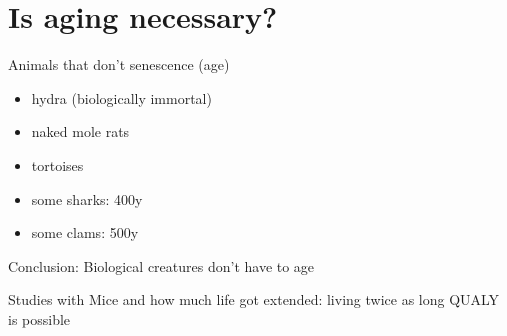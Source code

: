 \section{Is aging necessary?}


\begin{frame}[c]{Animals that don't senescence (age)}
    \large
    \begin{itemize}[<+(1)->]
        \item hydra (biologically immortal) \cite{martinez1998mortality}
        \item naked mole rats \cite{ruby2018naked}
        \item tortoises \cite{miller2001escaping}
        \item some sharks: 400y \cite{Greenlan67:online}
        \item some clams: 500y \cite{munro2012extreme}
    \end{itemize}
    \pause
    Conclusion: Biological creatures don't have to age
\end{frame}



\begin{frame}[c]{Studies with Mice}
    and how much life got extended: living twice as long QUALY is possible
\end{frame}
